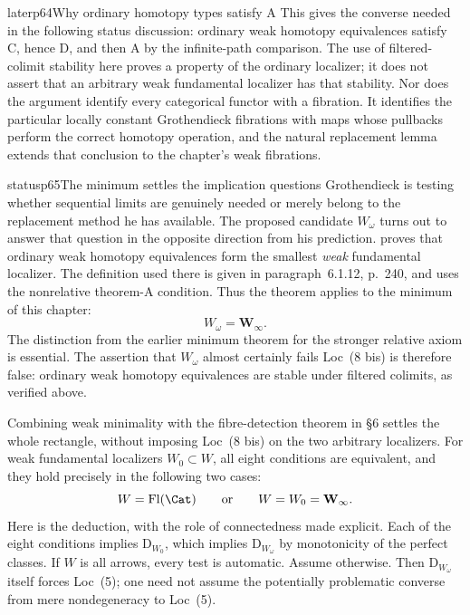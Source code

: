 \begin{dcomment}{later}{p64}{Why ordinary homotopy types satisfy A}
This gives the converse needed in the following status discussion: ordinary weak homotopy equivalences satisfy C, hence D, and then A by the infinite-path comparison. The use of filtered-colimit stability here proves a property of the ordinary localizer; it does not assert that an arbitrary weak fundamental localizer has that stability. Nor does the argument identify every categorical functor with a fibration. It identifies the particular locally constant Grothendieck fibrations with maps whose pullbacks perform the correct homotopy operation, and the natural replacement lemma extends that conclusion to the chapter's weak fibrations.
\end{dcomment}

\begin{dcomment}{status}{p65}{The minimum settles the implication questions}
Grothendieck is testing whether sequential limits are genuinely needed or merely belong to the replacement method he has available. The proposed candidate $W_\omega$ turns out to answer that question in the opposite direction from his prediction. \citet[Theorem~6.1.18, pp.~242--243]{Cisinski2006} proves that ordinary weak homotopy equivalences form the smallest \emph{weak} fundamental localizer. The definition used there is given in paragraph~6.1.12, p.~240, and uses the nonrelative theorem-A condition. Thus the theorem applies to the minimum of this chapter:
\[
 W_\omega=\mathbf W_\infty.
\]
The distinction from the earlier minimum theorem for the stronger relative axiom is essential. The assertion that $W_\omega$ almost certainly fails Loc~(8 bis) is therefore false: ordinary weak homotopy equivalences are stable under filtered colimits, as verified above.

Combining weak minimality with the fibre-detection theorem in \S6 settles the whole rectangle, without imposing Loc~(8 bis) on the two arbitrary localizers. For weak fundamental localizers $W_0\subset W$, all eight conditions are equivalent, and they hold precisely in the following two cases:
\[
 W=\mathrm{Fl}(\Cat)
 \qquad\text{or}\qquad
 W=W_0=\mathbf W_\infty.
\]
Here is the deduction, with the role of connectedness made explicit. Each of the eight conditions implies $\mathrm D_{W_0}$, which implies $\mathrm D_{W_\omega}$ by monotonicity of the perfect classes. If $W$ is all arrows, every test is automatic. Assume otherwise. Then $\mathrm D_{W_\omega}$ itself forces Loc~(5); one need not assume the potentially problematic converse from mere nondegeneracy to Loc~(5).


\end{dcomment}
